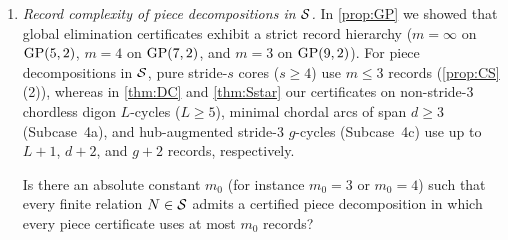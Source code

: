 \begin{enumerate}[label=\arabic*.,leftmargin=2em]
\item \emph{Record complexity of piece decompositions in $\mathcal{S}$.} In \cref{prop:GP} we showed that global elimination
  certificates exhibit a strict record hierarchy ($m = \infty$ on $\operatorname{GP}(5,2)$, $m = 4$ on $\operatorname{GP}(7,2)$, and $m = 3$ on
  $\operatorname{GP}(9,2)$). For piece decompositions in $\mathcal{S}$, pure stride-$s$ cores ($s \ge 4$) use $m \le 3$ records
  (\cref{prop:CS}(2)), whereas in \cref{thm:DC} and \cref{thm:Sstar} our certificates on non-stride-$3$ chordless digon
  $L$-cycles ($L \ge 5$), minimal chordal arcs of span $d \ge 3$ (Subcase~4a), and hub-augmented stride-$3$ $g$-cycles
  (Subcase~4c) use up to $L + 1$, $d + 2$, and $g + 2$ records, respectively.
  \begin{problem}\label{prob:records}
  Is there an absolute constant $m_0$ (for instance $m_0 = 3$ or $m_0 = 4$) such that every finite relation $N \in \mathcal{S}$
  admits a certified piece decomposition in which every piece certificate uses at most $m_0$ records?
  \end{problem}


\end{enumerate}
